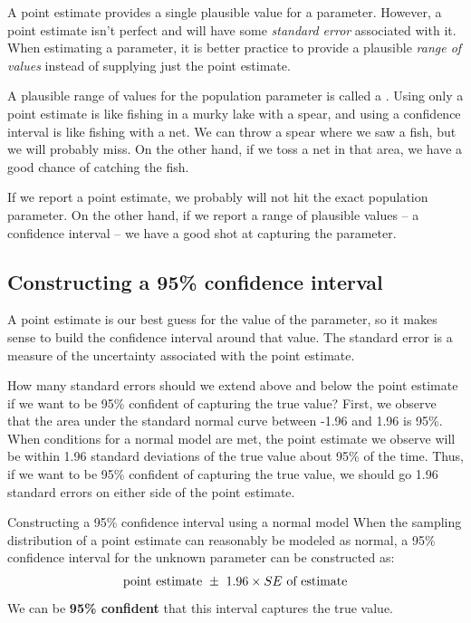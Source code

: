 A point estimate provides a single plausible value for a parameter. However, a point estimate isn't perfect and will have some \emph{standard error} associated with it. When estimating a parameter,
it is better practice to provide a plausible
\emph{range of values} instead of supplying just the point
estimate.

A plausible range of values for the population parameter is called a . Using only a point estimate is like fishing in a murky lake with a spear, and using a confidence interval is like fishing with a net. We can throw a spear where we saw a fish, but we will probably miss. On the other hand, if we toss a net in that area, we have a good chance of catching the fish.

If we report a point estimate, we probably will not hit the exact population parameter. On the other hand, if we report a range of plausible values -- a confidence interval -- we have a good shot at capturing the parameter.

\subsection{Constructing a 95\% confidence interval}

A point estimate is our best guess for the value of the parameter, so it makes sense to build the confidence interval around that value. The standard error is a measure of the uncertainty associated with the point estimate.  

\begin{examplewrap}
\begin{nexample}{How many standard errors should we extend above and below the point estimate if we want to be 95\% confident of capturing the true value?  }
First, we observe that the area under the standard normal curve between -1.96 and 1.96 is 95\%.  When conditions for a normal model are met, the point estimate we observe will be within 1.96 standard deviations of the true value about 95\% of the time.  Thus, if we want to be 95\% confident of capturing the true value, we should go 1.96 standard errors on either side of the point estimate.
\end{nexample}
\end{examplewrap}

\begin{onebox}{Constructing a 95\% confidence interval using a normal model}
When the sampling distribution of a point estimate can reasonably be modeled as normal, a 95\% confidence interval for the unknown parameter can be constructed as: \vspace{-2mm}
\begin{align}
\text{point estimate}\ \pm\ 1.96 \times SE\text{ of estimate}\vspace{-2mm}
\label{95PercentConfidenceIntervalFormula}
\end{align}
We can be \textbf{95\% confident} that this interval captures the true value.\end{onebox}

